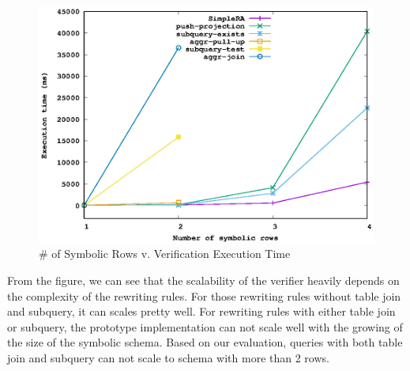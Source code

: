 \begin{figure}[!htb]
  \centering
  \includegraphics[width=0.7\linewidth]{scale.eps}
  \caption{\# of Symbolic Rows v. Verification Execution Time}
  \label{fig:scale}
\end{figure}

From the figure, we can see that the scalability of the verifier heavily depends 
on the complexity of the rewriting rules.
For those rewriting rules without table join and subquery, it can scales pretty well.
For rewriting rules with either table join or subquery, the prototype implementation can 
not scale well with the growing of the size of the symbolic schema.
Based on our evaluation, queries with both table join and subquery can not scale to schema with
more than 2 rows.
